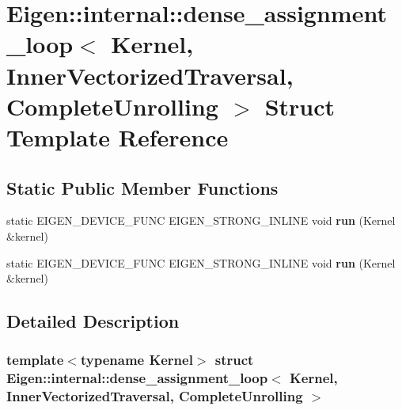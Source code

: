 \hypertarget{struct_eigen_1_1internal_1_1dense__assignment__loop_3_01_kernel_00_01_inner_vectorized_traversal_00_01_complete_unrolling_01_4}{}\section{Eigen\+:\+:internal\+:\+:dense\+\_\+assignment\+\_\+loop$<$ Kernel, Inner\+Vectorized\+Traversal, Complete\+Unrolling $>$ Struct Template Reference}
\label{struct_eigen_1_1internal_1_1dense__assignment__loop_3_01_kernel_00_01_inner_vectorized_traversal_00_01_complete_unrolling_01_4}
\subsection*{Static Public Member Functions}
\begin{DoxyCompactItemize}
\item 
\mbox{\label{struct_eigen_1_1internal_1_1dense__assignment__loop_3_01_kernel_00_01_inner_vectorized_traversal_00_01_complete_unrolling_01_4_a903c9b84389dcdb758dd8dcc7e742283}} 
static E\+I\+G\+E\+N\+\_\+\+D\+E\+V\+I\+C\+E\+\_\+\+F\+U\+NC E\+I\+G\+E\+N\+\_\+\+S\+T\+R\+O\+N\+G\+\_\+\+I\+N\+L\+I\+NE void {\bfseries run} (Kernel \&kernel)
\item 
\mbox{\label{struct_eigen_1_1internal_1_1dense__assignment__loop_3_01_kernel_00_01_inner_vectorized_traversal_00_01_complete_unrolling_01_4_a903c9b84389dcdb758dd8dcc7e742283}} 
static E\+I\+G\+E\+N\+\_\+\+D\+E\+V\+I\+C\+E\+\_\+\+F\+U\+NC E\+I\+G\+E\+N\+\_\+\+S\+T\+R\+O\+N\+G\+\_\+\+I\+N\+L\+I\+NE void {\bfseries run} (Kernel \&kernel)
\end{DoxyCompactItemize}


\subsection{Detailed Description}
\subsubsection*{template$<$typename Kernel$>$\newline
struct Eigen\+::internal\+::dense\+\_\+assignment\+\_\+loop$<$ Kernel, Inner\+Vectorized\+Traversal, Complete\+Unrolling $>$}



